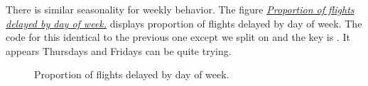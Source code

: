 \documentclass[letterpaper,10pt,english]{sphinxmanual}
\begin{document}
There is similar seasonality for weekly behavior. The figure {\hyperref[airline:delay-by-day-of-week]{\emph{Proportion of flights delayed by day of week.}}} displays proportion of
flights delayed by day of week. The code for this identical to the previous one
except we split on  and the key is . It appears
Thursdays and Fridays can be quite trying.
\begin{figure}[htbp]
\centering
\capstart

\caption{Proportion of flights delayed by day of week.}\label{airline:delay-by-day-of-week}\end{figure}
\end{document}
